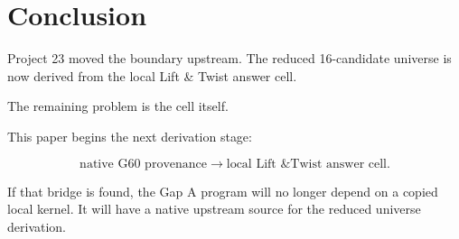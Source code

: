 \section{Conclusion}

Project 23 moved the boundary upstream.  The reduced 16-candidate universe is now derived from the local Lift \& Twist answer cell.

The remaining problem is the cell itself.

This paper begins the next derivation stage:

\[
    \text{native G60 provenance}
    \longrightarrow
    \text{local Lift \& Twist answer cell}.
\]

If that bridge is found, the Gap A program will no longer depend on a copied local kernel.  It will have a native upstream source for the reduced universe derivation.
